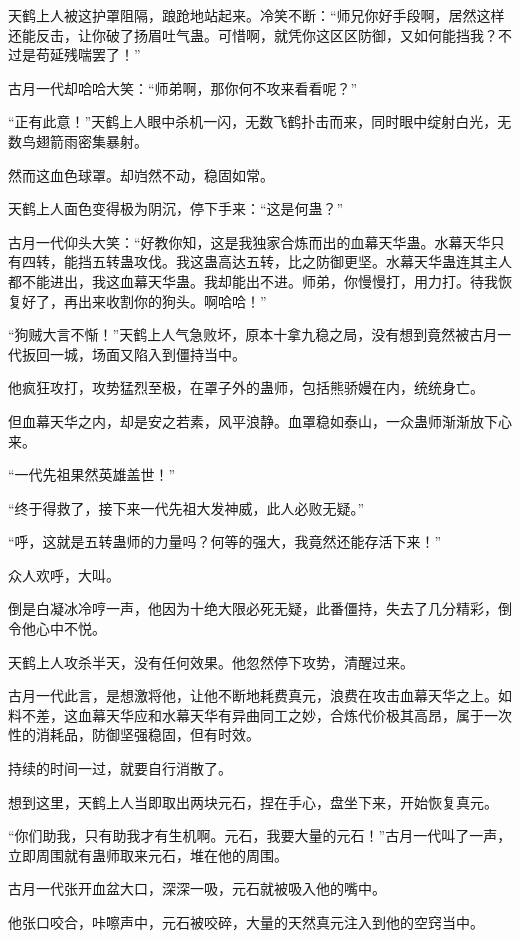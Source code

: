 \begin{this_body}
天鹤上人被这护罩阻隔，踉跄地站起来。冷笑不断：“师兄你好手段啊，居然这样还能反击，让你破了扬眉吐气蛊。可惜啊，就凭你这区区防御，又如何能挡我？不过是苟延残喘罢了！”

古月一代却哈哈大笑：“师弟啊，那你何不攻来看看呢？”

“正有此意！”天鹤上人眼中杀机一闪，无数飞鹤扑击而来，同时眼中绽射白光，无数鸟翅箭雨密集暴射。

然而这血色球罩。却岿然不动，稳固如常。

天鹤上人面色变得极为阴沉，停下手来：“这是何蛊？”

古月一代仰头大笑：“好教你知，这是我独家合炼而出的血幕天华蛊。水幕天华只有四转，能挡五转蛊攻伐。我这蛊高达五转，比之防御更坚。水幕天华蛊连其主人都不能进出，我这血幕天华蛊。我却能出不进。师弟，你慢慢打，用力打。待我恢复好了，再出来收割你的狗头。啊哈哈！”

“狗贼大言不惭！”天鹤上人气急败坏，原本十拿九稳之局，没有想到竟然被古月一代扳回一城，场面又陷入到僵持当中。

他疯狂攻打，攻势猛烈至极，在罩子外的蛊师，包括熊骄嫚在内，统统身亡。

但血幕天华之内，却是安之若素，风平浪静。血罩稳如泰山，一众蛊师渐渐放下心来。

“一代先祖果然英雄盖世！”

“终于得救了，接下来一代先祖大发神威，此人必败无疑。”

“呼，这就是五转蛊师的力量吗？何等的强大，我竟然还能存活下来！”

众人欢呼，大叫。

倒是白凝冰冷哼一声，他因为十绝大限必死无疑，此番僵持，失去了几分精彩，倒令他心中不悦。

天鹤上人攻杀半天，没有任何效果。他忽然停下攻势，清醒过来。

古月一代此言，是想激将他，让他不断地耗费真元，浪费在攻击血幕天华之上。如料不差，这血幕天华应和水幕天华有异曲同工之妙，合炼代价极其高昂，属于一次性的消耗品，防御坚强稳固，但有时效。

持续的时间一过，就要自行消散了。

想到这里，天鹤上人当即取出两块元石，捏在手心，盘坐下来，开始恢复真元。

“你们助我，只有助我才有生机啊。元石，我要大量的元石！”古月一代叫了一声，立即周围就有蛊师取来元石，堆在他的周围。

古月一代张开血盆大口，深深一吸，元石就被吸入他的嘴中。

他张口咬合，咔嚓声中，元石被咬碎，大量的天然真元注入到他的空窍当中。


\end{this_body}
